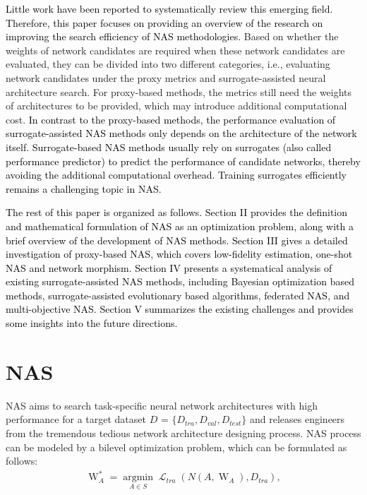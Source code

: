 \documentclass[journal]{IEEEtran}
\begin{document}
\textcolor{black}{Little work have been reported to systematically review this emerging field. Therefore, this paper focuses on providing an overview of the research on improving the search efficiency of NAS methodologies.}  Based on whether the weights of network candidates are required when these network candidates are evaluated, they can be divided into two different categories, i.e., evaluating network candidates under the proxy metrics and surrogate-assisted neural architecture search. For proxy-based methods, the metrics still need the weights of architectures to be provided, which may introduce additional computational cost. \textcolor{black}{In contrast to the proxy-based methods, the performance evaluation of surrogate-assisted NAS methods only depends on the architecture of the network itself. Surrogate-based NAS methods usually rely on surrogates (also called performance predictor) to predict the performance of candidate networks, thereby avoiding the additional computational overhead. Training surrogates efficiently remains a challenging topic in NAS.}

\textcolor{black}{The rest of this paper is organized as follows. Section II provides the definition and mathematical formulation of NAS as an optimization problem, along with a brief overview of the development of NAS methods. Section III gives a detailed investigation of proxy-based NAS, which covers low-fidelity estimation, one-shot NAS and network morphism. Section IV presents a systematical analysis of existing surrogate-assisted NAS methods, including Bayesian optimization based methods, surrogate-assisted evolutionary based algorithms, federated NAS, and multi-objective NAS.  Section V summarizes the existing challenges and provides some insights into the future directions.}


\section{NAS}

NAS aims to search task-specific neural network architectures with high performance for a target dataset $D$ = $\{D_{tra}, D_{val}, D_{test}\}$ and releases engineers from the tremendous tedious network architecture designing process. NAS process can be modeled by a bilevel optimization problem, which can be formulated as follows:
\begin{align}\label{1}
\mathop W\nolimits_A^*  = \mathop {\arg \min }\limits_{A \in S} \mathop \mathcal{L}\nolimits_{tra} (N(A,\mathop W\nolimits_A ), D_{tra}),
\end{align}
  
\end{document}
